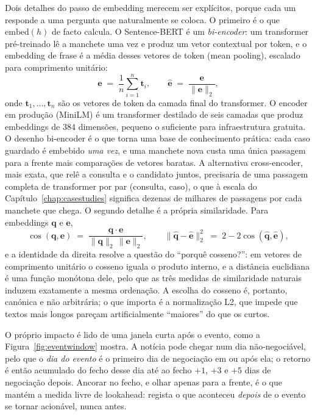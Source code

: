 Dois detalhes do passo de embedding merecem ser explícitos, porque cada um responde a uma pergunta que
naturalmente se coloca. O primeiro é o que $\mathrm{embed}(h)$ de facto calcula. O Sentence-BERT é um
\emph{bi-encoder}: um transformer pré-treinado lê a manchete uma vez e produz um vetor contextual por token,
e o embedding de frase é a média desses vetores de token (mean pooling), escalado para comprimento
unitário:
\begin{equation}
\mathbf{e} \;=\; \frac{1}{n}\sum_{i=1}^{n} \mathbf{t}_i,
\qquad
\hat{\mathbf{e}} \;=\; \frac{\mathbf{e}}{\lVert \mathbf{e} \rVert_2},
\label{eq:pooling}
\end{equation}
onde $\mathbf{t}_1,\dots,\mathbf{t}_n$ são os vetores de token da camada final do transformer. O encoder em
produção (MiniLM) é um transformer destilado de seis camadas que produz embeddings de $384$ dimensões,
pequeno o suficiente para infraestrutura gratuita. O desenho bi-encoder é o que torna uma base de
conhecimento prática: cada caso guardado é embebido \emph{uma vez}, e uma manchete nova custa uma única
passagem para a frente mais comparações de vetores baratas. A alternativa cross-encoder, mais exata, que
relê a consulta e o candidato juntos, precisaria de uma passagem completa de transformer por par (consulta,
caso), o que à escala do Capítulo~\ref{chap:casestudies} significa dezenas de milhares de passagens por cada
manchete que chega. O segundo detalhe é a própria similaridade. Para embeddings $\mathbf{q}$ e $\mathbf{e}$,
\begin{equation}
\cos(\mathbf{q},\mathbf{e}) \;=\;
\frac{\mathbf{q}\cdot\mathbf{e}}{\lVert\mathbf{q}\rVert_2\,\lVert\mathbf{e}\rVert_2},
\qquad
\lVert \hat{\mathbf{q}} - \hat{\mathbf{e}} \rVert_2^2 \;=\; 2 - 2\cos(\hat{\mathbf{q}},\hat{\mathbf{e}}),
\label{eq:cosine}
\end{equation}
e a identidade da direita resolve a questão do ``porquê cosseno?'': em vetores de comprimento unitário o
cosseno iguala o produto interno, e a distância euclidiana é uma função monótona dele, pelo que as três
medidas de similaridade naturais induzem exatamente a mesma ordenação. A escolha do cosseno é, portanto,
canónica e não arbitrária; o que importa é a normalização L2, que impede que textos mais longos pareçam
artificialmente ``maiores'' do que os curtos.

O próprio impacto é lido de uma janela curta após o evento, como a Figura~\ref{fig:eventwindow} mostra. A
notícia pode chegar num dia não-negociável, pelo que o \emph{dia do evento} é o primeiro dia de negociação
em ou após ela; o retorno é então acumulado do fecho desse dia até ao fecho $+1$, $+3$ e $+5$ dias de
negociação depois. Ancorar no fecho, e olhar apenas para a frente, é o que mantém a medida livre de
lookahead: regista o que aconteceu \emph{depois} de o evento se tornar acionável, nunca antes.


